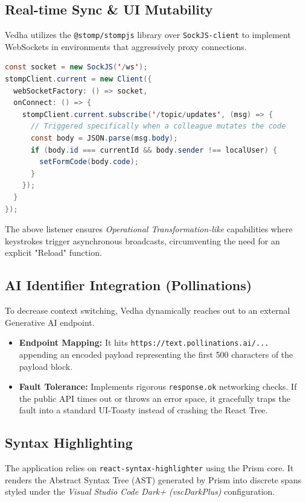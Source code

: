 \documentclass[12pt,a4paper]{article}
\begin{document}
\subsection{Real-time Sync \& UI Mutability}
Vedha utilizes the \texttt{@stomp/stompjs} library over \texttt{SockJS-client} to implement WebSockets in environments that aggressively proxy connections.
\begin{lstlisting}[language=java, caption=Socket Initialization Paradigm]
const socket = new SockJS('/ws');
stompClient.current = new Client({
  webSocketFactory: () => socket,
  onConnect: () => {
    stompClient.current.subscribe('/topic/updates', (msg) => {
      // Triggered specifically when a colleague mutates the code
      const body = JSON.parse(msg.body);
      if (body.id === currentId && body.sender !== localUser) {
        setFormCode(body.code); 
      }
    });
  }
});
\end{lstlisting}
The above listener ensures \textit{Operational Transformation-like} capabilities where keystrokes trigger asynchronous broadcasts, circumventing the need for an explicit "Reload" function.

\subsection{AI Identifier Integration (Pollinations)}
To decrease context switching, Vedha dynamically reaches out to an external Generative AI endpoint.
\begin{itemize}
    \item \textbf{Endpoint Mapping:} It hits \texttt{https://text.pollinations.ai/...} appending an encoded payload representing the first 500 characters of the payload block.
    \item \textbf{Fault Tolerance:} Implements rigorous \texttt{response.ok} networking checks. If the public API times out or throws an error space, it gracefully traps the fault into a standard UI-Toasty instead of crashing the React Tree.
\end{itemize}

\subsection{Syntax Highlighting}
The application relies on \texttt{react-syntax-highlighter} using the Prism core. It renders the Abstract Syntax Tree (AST) generated by Prism into discrete spans styled under the \textit{Visual Studio Code Dark+ (vscDarkPlus)} configuration.
\end{document}
